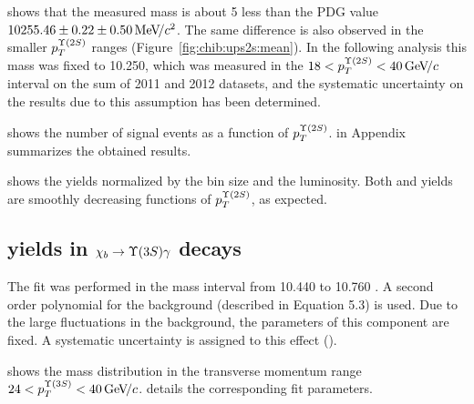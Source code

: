


 shows that the measured \chiboneTwoP mass is
about 5 \mevcc less than the PDG value $10255.46  \pm 0.22 \pm 0.50 {\mathrm{\,Me\kern -0.1em V\!/}c^2}$.
The same difference is also observed in the smaller $p_T^{\Y2S}$ ranges
(Figure~\ref{fig:chib:ups2s:mean}).
In the following analysis this mass was fixed to 10.250\gevcc, which was measured
in the $18 < p_T^{\Y2S} < 40 \gevc$ interval on the sum of 2011 and 2012 datasets, and the
systematic uncertainty on the results due to this assumption has been
determined.



 shows the number of signal events as a function
of $p_T^{\Y2S}$.  in Appendix summarizes the
obtained results.



 shows the yields normalized by the bin
size and the luminosity. Both \chibTwoP and \chibThreeP yields are smoothly
decreasing functions of $p_T^{\Y2S}$, as expected.
\subsection{\texorpdfstring{\chib}{xb} yields in
    \texorpdfstring{$\chib \to \Y3S \gamma$}{xb --> Y(3S) gamma} decays}
\label{sec:chib:ups3s:fit}

The fit was performed in the mass interval from  10.440 to 10.760 \gevcc. 
A second order polynomial for the background (described in Equation 5.3) is used.
Due to the large fluctuations in the background, the
parameters of this component are fixed. 
A systematic uncertainty is assigned to this effect ().


 shows the mass distribution in the
transverse momentum range $24<p_T^{\Y3S}<40\gevc$.
 details the corresponding fit parameters.




